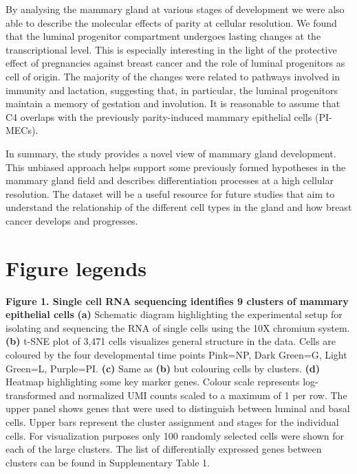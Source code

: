 \documentclass[titlepage, 12pt, oneside]{amsart}
\newcommand{\fakefigure}[1]%
{\refstepcounter{figure}\label{#1}}
\begin{document}
By analysing the mammary gland at various stages of development we were also able to describe the molecular effects of parity at cellular resolution.
We found that the luminal progenitor compartment undergoes lasting changes at the transcriptional level.
This is especially interesting in the light of the protective effect of pregnancies against breast cancer and the role of luminal progenitors as cell of origin.
The majority of the changes were related to pathways involved in immunity and lactation, suggesting that, in particular, the luminal progenitors maintain a memory of gestation and involution.
It is reasonable to assume that C4 overlaps with the previously parity-induced mammary epithelial cells (PI-MECs)\autocite{Wagner2002}.

In summary, the study provides a novel view of mammary gland development.
This unbiased approach helps support some previously formed hypotheses in the mammary gland field and describes differentiation processes at a high cellular resolution.
The dataset will be a useful resource for future studies that aim to understand the relationship of the different cell types in the gland and how breast cancer develops and progresses.

\section{Figure legends}

\textbf{Figure 1. Single cell RNA sequencing identifies 9 clusters of
mammary epithelial cells }
\fakefigure{F1}
\textbf{(a)} Schematic diagram highlighting the experimental setup for isolating and sequencing the RNA of single cells using the 10X chromium system.
\textbf{(b)} t-SNE plot of 3,471 cells visualizes general structure in the data.
Cells are coloured by the four developmental time points Pink=NP, Dark Green=G, Light Green=L, Purple=PI.
\textbf{(c)} Same as \textbf{(b)} but colouring cells by clusters.
\textbf{(d)} Heatmap highlighting some key marker genes.
Colour scale represents log-transformed and normalized UMI counts scaled to a maximum of 1 per row.
The upper panel shows genes that were used to distinguish between luminal and basal cells.
Upper bars represent the cluster assignment and stages for the individual cells.
For visualization purposes only 100 randomly selected cells were shown for each of the large clusters.
The list of differentially expressed genes between clusters can be found in Supplementary Table 1.
\end{document}
